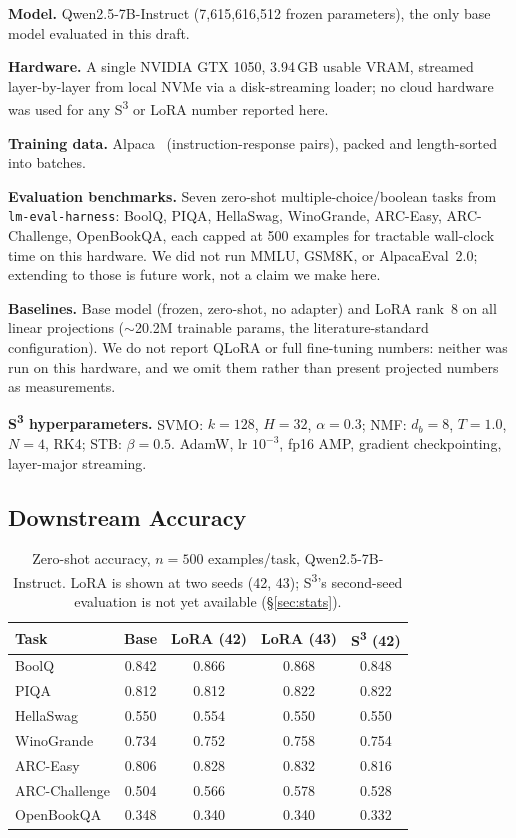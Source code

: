 \documentclass{scpe}
\newcommand{\sthree}{S\textsuperscript{3}}
\begin{document}
\textbf{Model.} Qwen2.5-7B-Instruct (7{,}615{,}616{,}512 frozen parameters), the only base model evaluated in this draft.

\textbf{Hardware.} A single NVIDIA GTX 1050, 3.94\,GB usable VRAM, streamed layer-by-layer from local NVMe via a disk-streaming loader; no cloud hardware was used for any \sthree{} or LoRA number reported here.

\textbf{Training data.} Alpaca~\cite{alpaca2023} (instruction-response pairs), packed and length-sorted into batches.

\textbf{Evaluation benchmarks.} Seven zero-shot multiple-choice/boolean tasks from \texttt{lm-eval-harness}: BoolQ, PIQA, HellaSwag, WinoGrande, ARC-Easy, ARC-Challenge, OpenBookQA, each capped at 500 examples for tractable wall-clock time on this hardware. We did not run MMLU, GSM8K, or AlpacaEval~2.0; extending to those is future work, not a claim we make here.

\textbf{Baselines.} Base model (frozen, zero-shot, no adapter) and LoRA rank~8 on all linear projections ($\sim$20.2M trainable params, the literature-standard configuration). We do not report QLoRA or full fine-tuning numbers: neither was run on this hardware, and we omit them rather than present projected numbers as measurements.

\textbf{\sthree{} hyperparameters.} SVMO: $k=128$, $H=32$, $\alpha=0.3$; NMF: $d_b=8$, $T=1.0$, $N=4$, RK4; STB: $\beta=0.5$. AdamW, lr $10^{-3}$, fp16 AMP, gradient checkpointing, layer-major streaming.

\subsection{Downstream Accuracy}
\label{sec:main-results}

\begin{table}[t]
\centering
\caption{Zero-shot accuracy, $n{=}500$ examples/task, Qwen2.5-7B-Instruct. LoRA is shown at two seeds (42, 43); \sthree{}'s second-seed evaluation is not yet available (\S\ref{sec:stats}).}
\label{tab:main}
\footnotesize
\setlength{\tabcolsep}{3pt}
\begin{tabular}{@{}lcccc@{}}
\toprule
\textbf{Task} & \textbf{Base} & \textbf{LoRA (42)} & \textbf{LoRA (43)} & \textbf{\sthree{} (42)} \\
\midrule
BoolQ         & 0.842 & 0.866 & 0.868 & 0.848 \\
PIQA          & 0.812 & 0.812 & 0.822 & 0.822 \\
HellaSwag     & 0.550 & 0.554 & 0.550 & 0.550 \\
WinoGrande    & 0.734 & 0.752 & 0.758 & 0.754 \\
ARC-Easy      & 0.806 & 0.828 & 0.832 & 0.816 \\
ARC-Challenge & 0.504 & 0.566 & 0.578 & 0.528 \\
OpenBookQA    & 0.348 & 0.340 & 0.340 & 0.332 \\
\bottomrule
\end{tabular}
\end{table}
\end{document}

